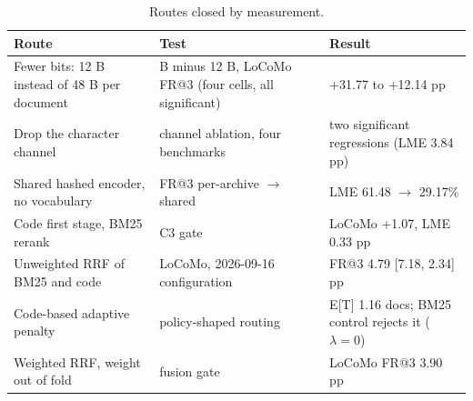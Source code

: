 \begin{table}[tbp]
\centering
\small
\caption{Routes closed by measurement.}
\label{tab:closed}
\begin{tabularx}{\linewidth}{@{}>{\raggedright\arraybackslash}p{5.0cm} >{\raggedright\arraybackslash}X >{\raggedright\arraybackslash}p{5.2cm}@{}}
\toprule
Route & Test & Result \\
\midrule
Fewer bits: 12 B instead of 48 B per document & 48 B minus 12 B, LoCoMo FR@3 (four cells, all significant) & +31.77 to +12.14 pp \\
Drop the character channel & channel ablation, four benchmarks & two significant regressions (LME \textminus{}3.84 pp) \\
Shared hashed encoder, no vocabulary & FR@3 per-archive $\to$ shared & LME 61.48 $\to$ 29.17\% \\
Code first stage, BM25 rerank & C3 gate & LoCoMo +1.07, LME \textminus{}0.33 pp \\
Unweighted RRF of BM25 and code & LoCoMo, 2026-09-16 configuration & FR@3 \textminus{}4.79 [\textminus{}7.18, \textminus{}2.34] pp \\
Code-based adaptive penalty & policy-shaped routing & E[T] \textminus{}1.16 docs; BM25 control rejects it ($\lambda=0$) \\
Weighted RRF, weight out of fold & fusion gate & LoCoMo FR@3 \textminus{}3.90 pp \\
\bottomrule
\end{tabularx}
\end{table}
